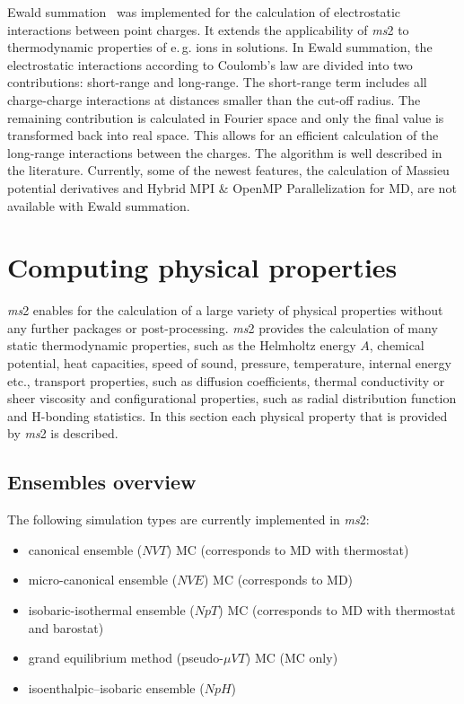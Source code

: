 Ewald summation~\parencite{Allen,Frenkel} was implemented for the calculation of electrostatic interactions between point charges. It extends the applicability of \textit{ms}2 to thermodynamic properties of e.\,g. ions in solutions. In Ewald summation, the electrostatic interactions according to Coulomb's law are divided into two contributions: short-range and long-range. The short-range term includes all charge-charge interactions at distances smaller than the cut-off radius. The remaining contribution is calculated in Fourier space and only the final value is transformed back into real space. This allows for an efficient calculation of the long-range interactions between the charges. The algorithm is well described in the literature. Currently, some of the newest features, the calculation of Massieu potential derivatives and Hybrid MPI \& OpenMP Parallelization for MD, are not available with Ewald summation.



\section{Computing physical properties}
\label{sec:PhysProps}

\textit{ms}2 enables for the calculation of a large variety of physical properties without any further packages or post-processing. \textit{ms}2 provides the calculation of many static thermodynamic properties, such as the Helmholtz energy $A$, chemical potential, heat capacities, speed of sound, pressure, temperature, internal energy etc., transport properties, such as diffusion coefficients, thermal conductivity or sheer viscosity and configurational properties, such as radial distribution function and H-bonding statistics. In this section each physical property that is provided by \textit{ms}2 is described. 


\subsection{Ensembles overview}
\label{sec:Ensembles}

The following simulation types are currently implemented in \textit{ms}2:
\begin{itemize}
	\item canonical ensemble ($NVT$) MC (corresponds to MD with thermostat)
	\item micro-canonical ensemble ($NVE$) MC (corresponds to MD)
	\item isobaric-isothermal ensemble ($NpT$) MC (corresponds to MD with thermostat and barostat)
	\item grand equilibrium method (pseudo-$\mu VT$) MC (MC only)
	\item isoenthalpic–isobaric ensemble ($NpH$) 
\end{itemize}


